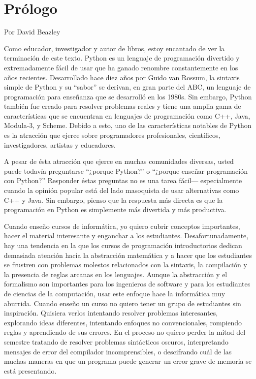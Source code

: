 \chapter{Prólogo}

Por David Beazley

Como educador, investigador y autor de libros, estoy encantado de
ver la terminación de este texto. Python es un lenguaje de programación
divertido y extremadamente fácil de usar que ha ganado renombre constantemente
en los años recientes. Desarrollado hace diez años por Guido van Rossum,
la sintaxis simple de Python y su ``sabor'' se derivan, en gran
parte del ABC, un lenguaje de programación para enseñanza que se desarrolló
en los 1980s. Sin embargo, Python también fue creado para resolver
problemas reales y tiene una amplia gama de características que se
encuentran en lenguajes de programación como C++, Java, Modula-3,
y Scheme. Debido a esto, uno de las características notables de Python
es la atracción que ejerce sobre programadores profesionales, científicos,
investigadores, artistas y educadores.

A pesar de ésta atracción que ejerce en muchas comunidades diversas,
usted puede todavía preguntarse ``¿porque Python?'' o ``¿porque
enseñar programación con Python?'' Responder éstas preguntas no es
una tarea fácil— especialmente cuando la opinión popular está del
lado masoquista de usar alternativas como C++ y Java. Sin embargo,
pienso que la respuesta más directa es que la programación en Python
es simplemente más divertida y más productiva.

Cuando enseño cursos de informática, yo quiero cubrir conceptos importantes,
hacer el material interesante y enganchar a los estudiantes. Desafortunadamente,
hay una tendencia en la que los cursos de programación introductorios
dedican demasiada atención hacia la abstracción matemática y a hacer
que los estudiantes se frustren con problemas molestos relacionados
con la sintaxis, la compilación y la presencia de reglas arcanas en
los lenguajes. Aunque la abstracción y el formalismo son importantes
para los ingenieros de software y para los estudiantes de ciencias
de la computación, usar este enfoque hace la informática muy aburrida.
Cuando enseño un curso no quiero tener un grupo de estudiantes sin
inspiración. Quisiera verlos intentando resolver problemas interesantes,
explorando ideas diferentes, intentando enfoques no convencionales,
rompiendo reglas y aprendiendo de sus errores. En el proceso no quiero
perder la mitad del semestre tratando de resolver problemas sintácticos
oscuros, interpretando mensajes de error del compilador incomprensibles,
o descifrando cuál de las muchas maneras en que un programa puede
generar un error grave de memoria se está presentando.

